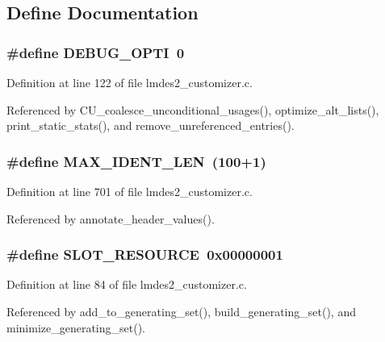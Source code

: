 \subsection{Define Documentation}
\subsubsection{\setlength{\rightskip}{0pt plus 5cm}\#define DEBUG\_\-OPTI~0}\label{lmdes2__customizer_8c_6ae2868cfb34bf62378235a206c9800c}




Definition at line 122 of file lmdes2\_\-customizer.c.

Referenced by CU\_\-coalesce\_\-unconditional\_\-usages(), optimize\_\-alt\_\-lists(), print\_\-static\_\-stats(), and remove\_\-unreferenced\_\-entries().
\subsubsection{\setlength{\rightskip}{0pt plus 5cm}\#define MAX\_\-IDENT\_\-LEN~(100+1)}\label{lmdes2__customizer_8c_9cf0008f332fed26b2b4149b66205559}




Definition at line 701 of file lmdes2\_\-customizer.c.

Referenced by annotate\_\-header\_\-values().
\subsubsection{\setlength{\rightskip}{0pt plus 5cm}\#define SLOT\_\-RESOURCE~0x00000001}\label{lmdes2__customizer_8c_d2fffad840fe164eb77141c323a1bc9b}




Definition at line 84 of file lmdes2\_\-customizer.c.

Referenced by add\_\-to\_\-generating\_\-set(), build\_\-generating\_\-set(), and minimize\_\-generating\_\-set().
